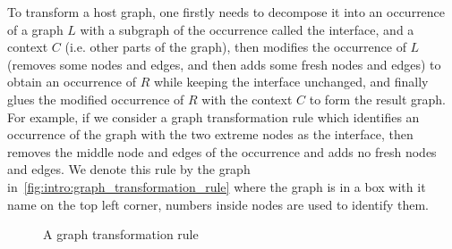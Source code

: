   To transform a host graph,
   one firstly needs to decompose it into an occurrence of a graph $L$ with a subgraph of the occurrence called the interface, and a context $C$ (i.e. other parts of the graph),
   then modifies the occurrence of $L$ (removes some nodes and edges, and then adds some fresh nodes and edges)
   to obtain an occurrence of $R$ while keeping the interface unchanged,
    and finally glues the modified occurrence of $R$ with the context $C$ 
   to form the result graph. For example, if we consider a graph transformation rule which identifies an occurrence of the graph  with the two extreme nodes as the interface, then removes the middle node and edges of the occurrence and adds no fresh nodes and edges.
We denote this rule by the graph in~\autoref{fig:intro:graph_transformation_rule} where the graph is in a box with it name on the top left corner, numbers inside nodes are used to identify them.
\begin{figure}[htbp]
    \centering
    \caption{A graph transformation rule}
    \label{fig:intro:graph_transformation_rule}
\end{figure}

